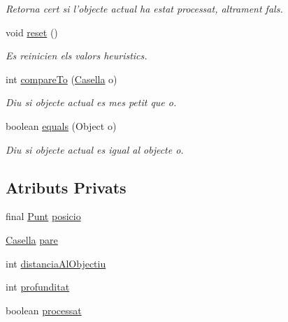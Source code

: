 \begin{DoxyCompactItemize}
\begin{DoxyCompactList}\small\item\em Retorna cert si l'objecte actual ha estat processat, altrament fals. \end{DoxyCompactList}\item 
void \hyperlink{classlogica_1_1algoritmica_1_1_casella_a8ed287353991f4b700bc45145dc00ab7}{reset} ()
\begin{DoxyCompactList}\small\item\em Es reinicien els valors heuristics. \end{DoxyCompactList}\item 
int \hyperlink{classlogica_1_1algoritmica_1_1_casella_aae2b9f535fd0da3a750f6a6048db1944}{compare\+To} (\hyperlink{classlogica_1_1algoritmica_1_1_casella}{Casella} o)
\begin{DoxyCompactList}\small\item\em Diu si objecte actual es mes petit que o. \end{DoxyCompactList}\item 
boolean \hyperlink{classlogica_1_1algoritmica_1_1_casella_ab47747886e465a9fdda726b0cdb987da}{equals} (Object o)
\begin{DoxyCompactList}\small\item\em Diu si objecte actual es igual al objecte o. \end{DoxyCompactList}\end{DoxyCompactItemize}
\subsection*{Atributs Privats}
\begin{DoxyCompactItemize}
\item 
final \hyperlink{classlogica_1_1_punt}{Punt} \hyperlink{classlogica_1_1algoritmica_1_1_casella_ad26c2e494cfa1a9362cf001a061ea375}{posicio}
\item 
\hyperlink{classlogica_1_1algoritmica_1_1_casella}{Casella} \hyperlink{classlogica_1_1algoritmica_1_1_casella_a2b3a9ec985ee8925d1b11ef42e1b3b80}{pare}
\item 
int \hyperlink{classlogica_1_1algoritmica_1_1_casella_ad412db755fc91149053db6100870bf70}{distancia\+Al\+Objectiu}
\item 
int \hyperlink{classlogica_1_1algoritmica_1_1_casella_aa1e2c28f03ba466a988117daab70ce57}{profunditat}
\item 
boolean \hyperlink{classlogica_1_1algoritmica_1_1_casella_aa4c76bca181afa4cfa68b7150365305d}{processat}
\end{DoxyCompactItemize}


